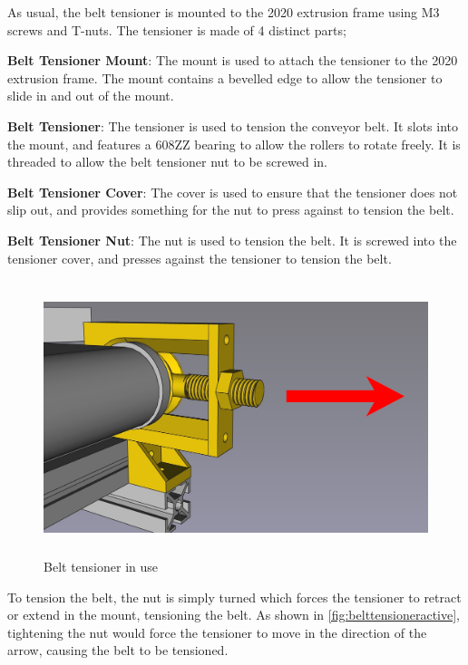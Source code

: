 As usual, the belt tensioner is mounted to the 2020 extrusion frame using M3 screws and T-nuts. The tensioner is made of 4 distinct parts;
\par
\textbf{Belt Tensioner Mount}: The mount is used to attach the tensioner to the 2020 extrusion frame. The mount contains a bevelled edge to allow the tensioner to slide in and out of the mount.
\par
\textbf{Belt Tensioner}: The tensioner is used to tension the conveyor belt. It slots into the mount, and features a 608ZZ bearing to allow the rollers to rotate freely. It is threaded to allow the belt tensioner nut to be screwed in.
\par
\textbf{Belt Tensioner Cover}: The cover is used to ensure that the tensioner does not slip out, and provides something for the nut to press against to tension the belt.
\par
\textbf{Belt Tensioner Nut}: The nut is used to tension the belt. It is screwed into the tensioner cover, and presses against the tensioner to tension the belt.

\begin{figure}[H]
    \begin{minipage}[h]{0.95\textwidth}
        \centering
        \includegraphics[height=8cm]{imgs/freecad/tensionerapplication.jpg}
        \caption{Belt tensioner in use}
        \label{fig:belttensioneractive}
    \end{minipage}
\end{figure}

To tension the belt, the nut is simply turned which forces the tensioner to retract or extend in the mount, tensioning the belt. As shown in \autoref{fig:belttensioneractive}, tightening the nut would force the tensioner to move in the direction of the arrow, causing the belt to be tensioned.

